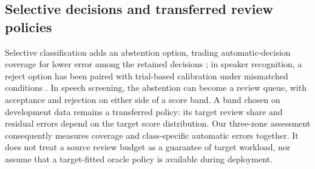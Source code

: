 \subsection{Selective decisions and transferred review policies}
Selective classification adds an abstention option, trading automatic-decision coverage for lower error among
the retained decisions \citep{geifman17_selective}; in speaker recognition, a reject option has been paired with
trial-based calibration under mismatched conditions \citep{ferrer19_failsafe}. In speech screening, the abstention can become a review queue,
with acceptance and rejection on either side of a score band. A band chosen on development data remains a
transferred policy: its target review share and residual errors depend on the target score distribution. Our
three-zone assessment consequently measures coverage and class-specific automatic errors together. It does not
treat a source review budget as a guarantee of target workload, nor assume that a target-fitted oracle policy is
available during deployment.
